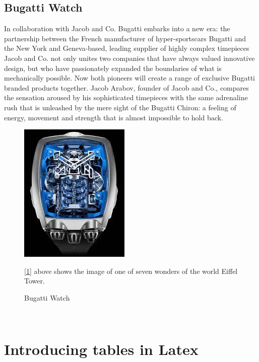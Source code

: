 \documentclass{article}
\begin{document}
\subsection{Bugatti Watch}
In collaboration with Jacob and Co. Bugatti embarks into a new era: the partnership between the French manufacturer of hyper-sportscars Bugatti and the New York and Geneva-based, leading supplier of highly complex timepieces Jacob and Co. not only unites two companies that have always valued innovative design, but who have passionately expanded the boundaries of what is mechanically possible. Now both pioneers will create a range of exclusive Bugatti branded products together. Jacob Arabov, founder of Jacob and Co., compares the sensation aroused by his sophisticated timepieces with the same adrenaline rush that is unleashed by the mere sight of the Bugatti Chiron: a feeling of energy, movement and strength that is almost impossible to hold back.
\\
\begin{figure}[h]
\includegraphics[scale= 0.8]{watch.jpeg}
\caption{Bugatti Watch}
\label{fig : Bugatti Watch}
[\ref{fig : Bugatti Watch}] above shows the image of one of seven wonders of the world Eiffel Tower.
\end{figure}
\\
\section{Introducing tables in Latex}
\end{document}
